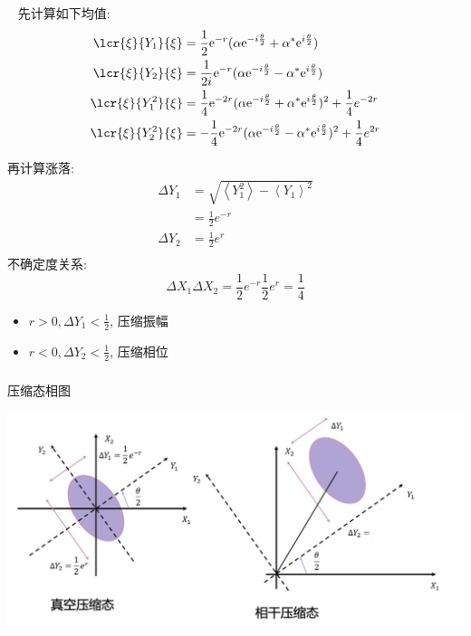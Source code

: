 \begin{frame}
  \解~ 先计算如下均值: 
  \[ \begin{aligned}
    \lcr{\xi}{Y_1 }{\xi} &= \frac{1}{2} \mathrm{e}^{-r} (\alpha \mathrm{e}^{-i\frac{\theta}{2}}+ \alpha^* \mathrm{e}^{i\frac{\theta}{2}})   \\ 
    \lcr{\xi}{Y_2 }{\xi} &= \frac{1}{2i} \mathrm{e}^{-r} (\alpha \mathrm{e}^{-i\frac{\theta}{2}}- \alpha^* \mathrm{e}^{i\frac{\theta}{2}})   \\ 
    \lcr{\xi}{Y_1 ^2 }{\xi} &=  \frac{1}{4} \mathrm{e}^{-2r} (\alpha \mathrm{e}^{-i\frac{\theta}{2}}+ \alpha^* \mathrm{e}^{i\frac{\theta}{2}})^2 +  \frac{1}{4} e^{-2r}  \\ 
    \lcr{\xi}{Y_2 ^2 }{\xi} &= -\frac{1}{4} \mathrm{e}^{-2r} (\alpha \mathrm{e}^{-i\frac{\theta}{2}}- \alpha^* \mathrm{e}^{i\frac{\theta}{2}})^2  +  \frac{1}{4} e^{ 2r}  \\ 
\end{aligned}\]

\end{frame}

\begin{frame}
  再计算涨落:  \\
  \[\begin{aligned}
    \Delta Y_1 &= \sqrt{ \left\langle Y_1 ^2 \right\rangle - \left\langle Y_1 \right\rangle ^2 } \\ 
    &=\frac{1}{2} e^{-r}  \\ 
 \Delta Y_2 &= \frac{1}{2} e^{r}  \\ 
\end{aligned} \]  
 不确定度关系: 
 \[  \Delta X_1 \Delta X_2 = \frac{1}{2} e^{-r} \frac{1}{2} e^{r} = \dfrac{1}{4} \]

 \begin{itemize}
     \item $ r>0, \Delta Y_1 < \frac{1}{2} $, 压缩振幅 
     \item $ r<0, \Delta Y_2 < \frac{1}{2} $, 压缩相位
 \end{itemize}


\end{frame}

\begin{frame}
 \frametitle{}
 压缩态相图
   \begin{center}
        \includegraphics[width=1.0\textwidth]{figs/2022-05-02-13-13-46.png}
   \end{center}   
\end{frame}

